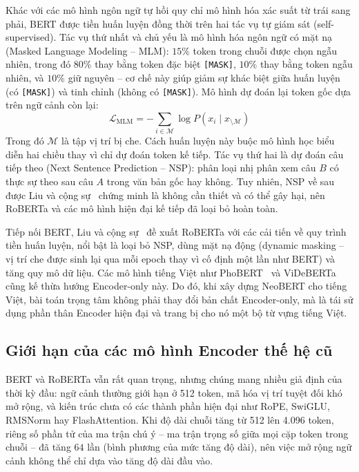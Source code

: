 Khác với các mô hình ngôn ngữ tự hồi quy chỉ mô hình hóa xác suất từ trái sang phải, BERT
được tiền huấn luyện đồng thời trên hai tác vụ tự giám sát (self-supervised). Tác vụ thứ nhất và chủ yếu là
mô hình hóa ngôn ngữ có mặt nạ (Masked Language Modeling -- MLM): $15\%$ token trong chuỗi
được chọn ngẫu nhiên, trong đó $80\%$ thay bằng token đặc biệt \texttt{[MASK]}, $10\%$ thay
bằng token ngẫu nhiên, và $10\%$ giữ nguyên -- cơ chế này giúp giảm sự khác biệt giữa
huấn luyện (có \texttt{[MASK]}) và tinh chỉnh (không có \texttt{[MASK]}). Mô hình dự đoán lại
token gốc dựa trên ngữ cảnh còn lại:
\begin{equation}
  \label{eq:mlm}
  \mathcal{L}_{\mathrm{MLM}} = -\sum_{i \in \mathcal{M}} \log P\!\left(x_i \mid x_{\setminus \mathcal{M}}\right)
\end{equation}
Trong đó $\mathcal{M}$ là tập vị trí bị che. Cách huấn luyện này buộc mô hình học biểu diễn
hai chiều thay vì chỉ dự đoán token kế tiếp. Tác vụ thứ hai là dự đoán câu tiếp theo
(Next Sentence Prediction -- NSP): phân loại nhị phân xem câu $B$ có thực sự theo sau câu
$A$ trong văn bản gốc hay không. Tuy nhiên, NSP về sau được Liu và cộng
sự~\cite{liu2019roberta} chứng minh là không cần thiết và có thể gây hại, nên RoBERTa và
các mô hình hiện đại kế tiếp đã loại bỏ hoàn toàn.

Tiếp nối BERT, Liu và cộng sự~\cite{liu2019roberta} đề xuất RoBERTa với các cải tiến về
quy trình tiền huấn luyện, nổi bật là loại bỏ NSP, dùng mặt nạ động (dynamic masking --
vị trí che được sinh lại qua mỗi epoch thay vì cố định một lần như BERT) và tăng quy mô dữ liệu.
Các mô hình tiếng Việt như PhoBERT~\cite{nguyen2020phobert} và
ViDeBERTa~\cite{lai2023videberta} cũng kế thừa hướng Encoder-only này. Do đó, khi xây dựng
NeoBERT cho tiếng Việt, bài toán trọng tâm không phải thay đổi bản chất Encoder-only, mà là
tái sử dụng phần thân Encoder hiện đại và trang bị cho nó một bộ từ vựng tiếng Việt.

\subsection{Giới hạn của các mô hình Encoder thế hệ cũ}
\label{subsec:bert-limits}

BERT và RoBERTa vẫn rất quan trọng, nhưng chúng mang nhiều giả định của thời kỳ đầu:
ngữ cảnh thường giới hạn ở 512 token, mã hóa vị trí tuyệt đối khó mở rộng, và kiến trúc chưa
có các thành phần hiện đại như RoPE, SwiGLU, RMSNorm hay FlashAttention. Khi độ dài chuỗi
tăng từ 512 lên 4.096 token, riêng số phần tử của ma trận chú ý -- ma trận trọng số giữa
mọi cặp token trong chuỗi -- đã tăng $64$ lần (bình phương của mức tăng độ dài), nên
việc mở rộng ngữ cảnh không thể chỉ dựa vào tăng độ dài đầu vào.

